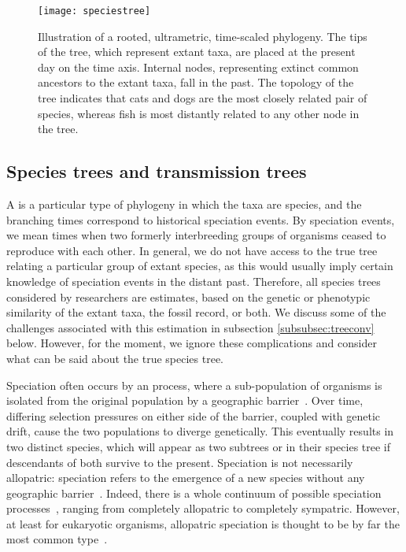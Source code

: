 \begin{figure}[ht]
  \centering
  \label{fig:speciestree}
  \texttt{[image: speciestree]}
  \caption[Illustration of a rooted, ultrametric, time-scaled phylogeny]
    {Illustration of a rooted, ultrametric, time-scaled phylogeny. The tips of
      the tree, which represent extant taxa, are placed at the present day on
      the time axis. Internal nodes, representing extinct common ancestors to
      the extant taxa, fall in the past. The topology of the tree indicates
      that cats and dogs are the most closely related pair of species, whereas
      fish is most distantly related to any other node in the tree.}
\end{figure}

\subsection{Species trees and transmission trees}
\label{subsubsec:speciestree}

A  is a particular type of phylogeny in which the taxa are
species, and the branching times correspond to historical speciation events. By
speciation events, we mean times when two formerly interbreeding groups of
organisms ceased to reproduce with each other. In general, we do not have
access to the true tree relating a particular group of extant species, as this
would usually imply certain knowledge of speciation events in the distant past.
Therefore, all species trees considered by researchers are estimates, based on
the genetic or phenotypic similarity of the extant taxa, the fossil record, or
both. We discuss some of the challenges associated with this estimation in
subsection \ref{subsubsec:treeconv} below. However, for the moment, we ignore
these complications and consider what can be said about the true species tree.

Speciation often occurs by an  process, where a sub-population
of organisms is isolated from the original population by a geographic
barrier~\autocite{coyne2004speciation}. Over time, differing selection
pressures on either side of the barrier, coupled with genetic drift, cause the
two populations to diverge genetically. This eventually results in two distinct
species, which will appear as two subtrees or  in their species
tree if descendants of both survive to the present. Speciation is not
necessarily allopatric:  speciation refers to the emergence of
a new species without any geographic barrier~\autocite{coyne2004speciation}.
Indeed, there is a whole continuum of possible speciation
processes~\autocite{fitzpatrick2008if}, ranging from completely allopatric to
completely sympatric. However, at least for eukaryotic organisms, allopatric
speciation is thought to be by far the most common
type~\autocite{coyne2004speciation}.

